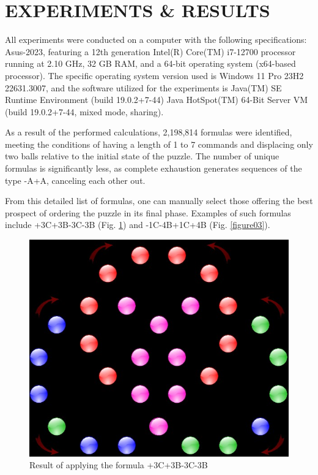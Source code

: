 \documentclass[a4paper,twocolumn,10pt]{article}
\begin{document}
\section{EXPERIMENTS \& RESULTS}

All experiments were conducted on a computer with the following specifications: Asus-2023, featuring a 12th generation Intel(R) Core(TM) i7-12700 processor running at 2.10 GHz, 32 GB RAM, and a 64-bit operating system (x64-based processor). The specific operating system version used is Windows 11 Pro 23H2 22631.3007, and the software utilized for the experiments is Java(TM) SE Runtime Environment (build 19.0.2+7-44) Java HotSpot(TM) 64-Bit Server VM (build 19.0.2+7-44, mixed mode, sharing).

As a result of the performed calculations, 2,198,814 formulas were identified, meeting the conditions of having a length of 1 to 7 commands and displacing only two balls relative to the initial state of the puzzle\cite{Balabanov2024b}. The number of unique formulas is significantly less, as complete exhaustion generates sequences of the type -A+A, canceling each other out.

From this detailed list of formulas, one can manually select those offering the best prospect of ordering the puzzle in its final phase. Examples of such formulas include +3C+3B-3C-3B (Fig. \ref{figure02}) and -1C-4B+1C+4B (Fig. \ref{figure03}).

\begin{figure}
	\centering
	\includegraphics[width=1.0\linewidth]{figure02.png}
	\caption{Result of applying the formula +3C+3B-3C-3B}
	\label{figure02}
\end{figure}
\end{document}
